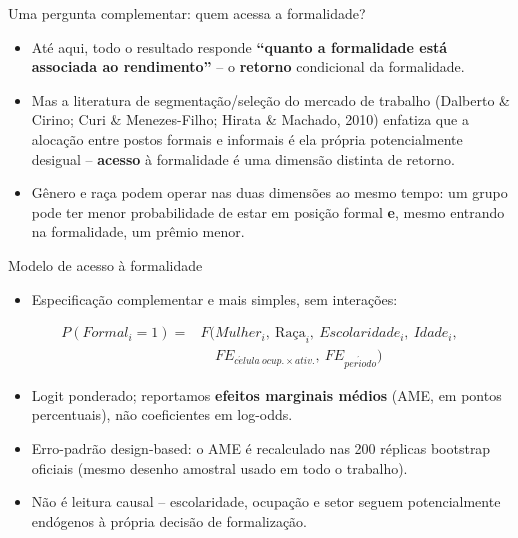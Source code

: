 \documentclass[aspectratio=169]{beamer}
\newcommand{\highlight}[1]{\textcolor{accentblue}{\textbf{#1}}}
\begin{document}
\begin{frame}{Uma pergunta complementar: quem acessa a formalidade?}
  \begin{itemize}
    \item At\'e aqui, todo o resultado responde \highlight{``quanto a formalidade est\'a associada ao rendimento''} -- o \highlight{retorno} condicional da formalidade.
    \item Mas a literatura de segmenta\c{c}\~ao/sele\c{c}\~ao do mercado de trabalho (Dalberto \& Cirino; Curi \& Menezes-Filho; Hirata \& Machado, 2010) enfatiza que a aloca\c{c}\~ao entre postos formais e informais \'e ela pr\'opria potencialmente desigual -- \highlight{acesso} \`a formalidade \'e uma dimens\~ao distinta de retorno.
    \item G\^enero e ra\c{c}a podem operar nas duas dimens\~oes ao mesmo tempo: um grupo pode ter menor probabilidade de estar em posi\c{c}\~ao formal \highlight{e}, mesmo entrando na formalidade, um pr\^emio menor.
  \end{itemize}
\end{frame}

\begin{frame}{Modelo de acesso \`a formalidade}
  \begin{itemize}
    \item Especifica\c{c}\~ao complementar e mais simples, sem intera\c{c}\~oes:
  \end{itemize}
  \small
  \begin{align*}
    P(Formal_i = 1) = {} & F(Mulher_i,\ \text{Ra\c{c}a}_i,\ Escolaridade_i,\ Idade_i, \\
                          & \phantom{F(} FE_{c\acute{e}lula\ ocup.\times ativ.},\ FE_{per\acute{i}odo})
  \end{align*}
  \normalsize
  \begin{itemize}
    \item Logit ponderado; reportamos \highlight{efeitos marginais m\'edios} (AME, em pontos percentuais), n\~ao coeficientes em log-odds.
    \item Erro-padr\~ao design-based: o AME \'e recalculado nas 200 r\'eplicas bootstrap oficiais (mesmo desenho amostral usado em todo o trabalho).
    \item N\~ao \'e leitura causal -- escolaridade, ocupa\c{c}\~ao e setor seguem potencialmente end\'ogenos \`a pr\'opria decis\~ao de formaliza\c{c}\~ao.
  \end{itemize}
\end{frame}
\end{document}
